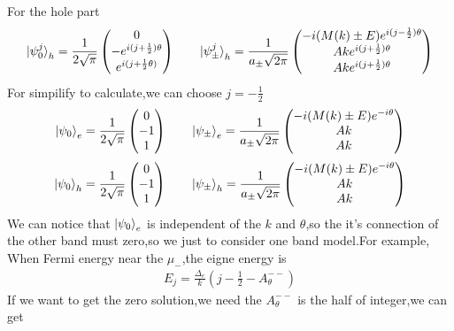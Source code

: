 \documentclass[4pt]{article}
\begin{document}
For the hole part
\begin{align}
	\ket{\psi_0^j}_h=\frac{1}{2\sqrt{\pi}}
	\begin{pmatrix}
		0\\
		-e^{i(j+\frac{1}{2})\theta}\\
		e^{i(j+\frac{1}{2}\theta)}
	\end{pmatrix}
	\qquad
	\ket{\psi_{\pm}^j}_h=\frac{1}{a_{\pm}\sqrt{2\pi}}
	\begin{pmatrix}
		-i(M(k)\pm E)e^{i(j-\frac{1}{2})\theta}\\
		Ake^{i(j+\frac{1}{2})\theta}\\
		Ake^{i(j+\frac{1}{2})\theta}
	\end{pmatrix}
\end{align}
For simpilify to calculate,we can choose $j=-\frac{1}{2}$
\begin{align}
	\ket{\psi_0}_e=\frac{1}{2\sqrt{\pi}}
	\begin{pmatrix}
		0\\
		-1\\
		1
	\end{pmatrix}
	\qquad
	\ket{\psi_{\pm}}_e=\frac{1}{a_{\pm}\sqrt{2\pi}}
	\begin{pmatrix}
		-i(M(k)\pm E)e^{-i\theta}\\
		Ak\\
		Ak
	\end{pmatrix}
\end{align}
\begin{align}
	\ket{\psi_0}_h=\frac{1}{2\sqrt{\pi}}
	\begin{pmatrix}
		0\\
		-1\\
		1
	\end{pmatrix}
	\qquad
	\ket{\psi_{\pm}}_h=\frac{1}{a_{\pm}\sqrt{2\pi}}
	\begin{pmatrix}
		-i(M(k)\pm E)e^{-i\theta}\\
		Ak\\
		Ak
	\end{pmatrix}
\end{align}	
We can notice that $\ket{\psi_0}_e$ is independent of the $k$ and $\theta$,so the it's connection of the other band must zero,so we just to consider one band model.For example, When Fermi energy near the $\mu_{-}$,the eigne energy is   
\begin{align}
	E_j=\frac{\Delta_e}{k}(j-\frac{1}{2}-A_{\theta}^{--})
\end{align}
If we want to get the zero solution,we need the $A_{\theta}^{--}$ is the half of integer,we can get 
\end{document}
